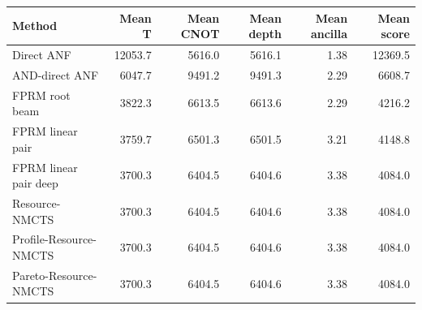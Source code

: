 \begin{tabular}{lrrrrr}
\toprule
Method & Mean T & Mean CNOT & Mean depth & Mean ancilla & Mean score \\
\midrule
Direct ANF & 12053.7 & 5616.0 & 5616.1 & 1.38 & 12369.5 \\
AND-direct ANF & 6047.7 & 9491.2 & 9491.3 & 2.29 & 6608.7 \\
FPRM root beam & 3822.3 & 6613.5 & 6613.6 & 2.29 & 4216.2 \\
FPRM linear pair & 3759.7 & 6501.3 & 6501.5 & 3.21 & 4148.8 \\
FPRM linear pair deep & 3700.3 & 6404.5 & 6404.6 & 3.38 & 4084.0 \\
Resource-NMCTS & 3700.3 & 6404.5 & 6404.6 & 3.38 & 4084.0 \\
Profile-Resource-NMCTS & 3700.3 & 6404.5 & 6404.6 & 3.38 & 4084.0 \\
Pareto-Resource-NMCTS & 3700.3 & 6404.5 & 6404.6 & 3.38 & 4084.0 \\
\bottomrule
\end{tabular}
